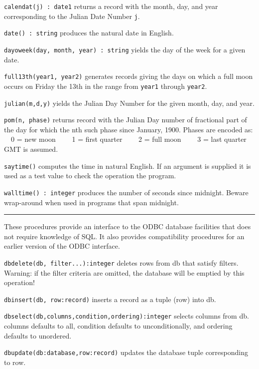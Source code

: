 \texttt{calendat(j) : date1} returns a record with the month, day, and
year corresponding to the Julian Date Number \texttt{j}.

\texttt{date() : string} produces the natural date in English.

\texttt{dayoweek(day, month, year) : string} yields the day of the
week for a given date.

\texttt{full13th(year1, year2)} generates records giving the days on
which a full moon occurs on Friday the 13th in the range from
\texttt{year1} through \texttt{year2}.

\texttt{julian(m,d,y)} yields the Julian Day Number for the given
month, day, and year.

\texttt{pom(n, phase)} returns record with the Julian Day number of
fractional part of the day for which the nth such phase since January,
1900. Phases are encoded as:\\
\ \ 0 = new moon \ \ \ \ 1 = first quarter \ \ \ \ 2 = full moon
\ \ \ \ 3 = last quarter\\
GMT is assumed.

\texttt{saytime()} computes the time in natural English. If an argument
is supplied it is used as a test value to check the operation the
program.

\texttt{walltime() : integer} produces the number of seconds since
midnight. Beware wrap-around when used in programs that span midnight.

\vspace{0.25cm}\hrule{}

These procedures provide an interface to the ODBC database facilities
that does not require knowledge of SQL. It also provides compatibility
procedures for an earlier version of the ODBC interface.

\texttt{dbdelete(db, filter...):integer} deletes rows from db that satisfy
filters. Warning: if the filter criteria are omitted, the
database will be emptied by this operation!

\texttt{dbinsert(db, row:record)} inserts a record as a tuple (row) into db.

\texttt{dbselect(db,columns,condition,ordering):integer} selects columns from db.
columns defaults to {\textquotedbl}all{\textquotedbl}, condition
defaults to unconditionally, and ordering defaults to unordered.

\texttt{dbupdate(db:database,row:record)} updates the database tuple
corresponding to row.

